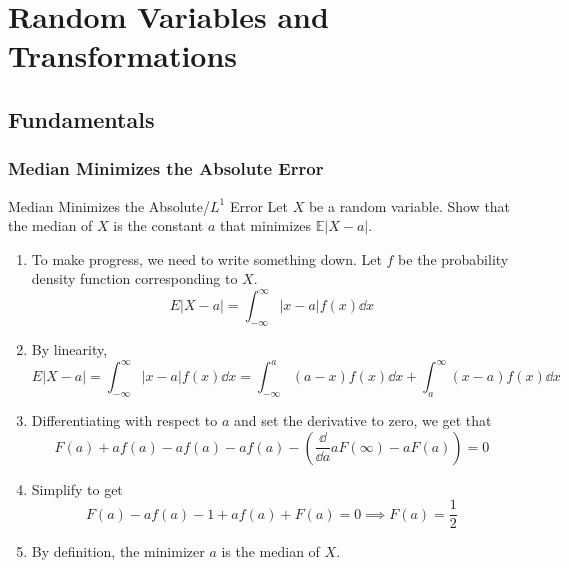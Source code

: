 \documentclass[../main]{subfiles}
\begin{document}
\chapter{Random Variables and Transformations}
\section{Fundamentals}
\subsection{Median Minimizes the Absolute Error}
\begin{bbox}{Median Minimizes the Absolute/$L^1$ Error}
    Let $X$ be a random variable. Show that the median of $X$ is the constant $a$ that minimizes $\mathbb E |X-a|$.
\end{bbox}
\begin{solution}
    \begin{enumerate}
        \item To make progress, we need to write something down. Let $f$ be the probability density function corresponding to $X$.
        \[
        E |X-a| = \int_{-\infty}^\infty |x-a| f(x)\dd x
        \]
        \item By linearity,
        \[
        E |X-a| = \int_{-\infty}^\infty |x-a| f(x)\dd x = \int_{-\infty}^a (a-x) f(x)  \dd x + \int_{a}^\infty (x-a) f(x) \dd x
        \]
        \item Differentiating with respect to $a$ and set the derivative to zero, we get that
        \[
        F(a) + af(a) - af(a) - af(a) - (\frac{\dd}{\dd a} aF(\infty) - aF(a)) = 0
        \]
        \item Simplify to get 
        \[
        F(a) - a f(a) - 1 + af(a) + F(a) = 0 \implies F(a) = \frac{1}{2}
        \]
        \item By definition, the minimizer $a$ is the median of $X$.
    \end{enumerate}
\end{solution}
\end{document}

